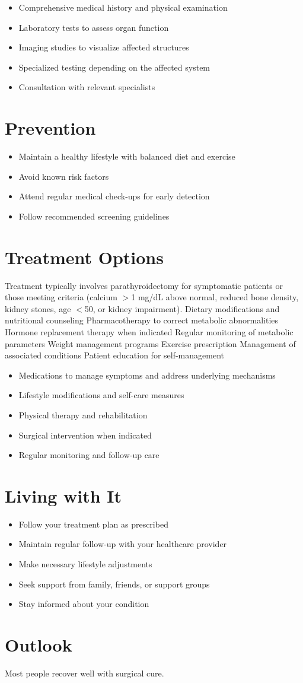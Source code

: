 \begin{itemize}[noitemsep]
  \item Comprehensive medical history and physical examination
  \item Laboratory tests to assess organ function
  \item Imaging studies to visualize affected structures
  \item Specialized testing depending on the affected system
  \item Consultation with relevant specialists
\end{itemize}
\section{Prevention}
\begin{itemize}[noitemsep]
  \item Maintain a healthy lifestyle with balanced diet and exercise
  \item Avoid known risk factors
  \item Attend regular medical check-ups for early detection
  \item Follow recommended screening guidelines
\end{itemize}
\section{Treatment Options}
Treatment typically involves parathyroidectomy for symptomatic patients or those meeting criteria (calcium $>$1 mg/dL above normal, reduced bone density, kidney stones, age $<$50, or kidney impairment). Dietary modifications and nutritional counseling Pharmacotherapy to correct metabolic abnormalities Hormone replacement therapy when indicated Regular monitoring of metabolic parameters Weight management programs Exercise prescription Management of associated conditions Patient education for self-management

\begin{itemize}[noitemsep]
  \item Medications to manage symptoms and address underlying mechanisms
  \item Lifestyle modifications and self-care measures
  \item Physical therapy and rehabilitation
  \item Surgical intervention when indicated
  \item Regular monitoring and follow-up care
\end{itemize}
\section{Living with It}
\begin{itemize}[noitemsep]
  \item Follow your treatment plan as prescribed
  \item Maintain regular follow-up with your healthcare provider
  \item Make necessary lifestyle adjustments
  \item Seek support from family, friends, or support groups
  \item Stay informed about your condition
\end{itemize}
\section{Outlook}
Most people recover well with surgical cure.
